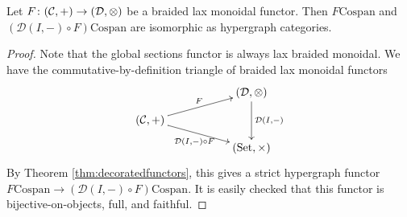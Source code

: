 \begin{proposition} \label{prop.setdecorations}
  Let $F{\colon} (\mathcal C, +) \to (\mathcal D, \otimes)$ be a braided lax
  monoidal functor. Then $F\mathrm{Cospan}$ and $(\mathcal D(I,-)\circ
  F)\mathrm{Cospan}$ are isomorphic as hypergraph categories.
\end{proposition}
\begin{proof}
  Note that the global sections functor is always lax braided monoidal. We have
  the commutative-by-definition triangle of braided lax monoidal functors
  \[
    \xymatrixrowsep{2ex}
    \xymatrix{
      && (\mathcal D,\otimes) \ar[dd]^{\mathcal D(I,-)} \\
      (\mathcal C,+) \ar[urr]^{F} \ar[drr]_{\mathcal D(I,-)\circ F} \\
      && (\Set, \times)
    }
  \]
  By Theorem \ref{thm:decoratedfunctors}, this gives a strict hypergraph functor
  $F\mathrm{Cospan} \to (\mathcal D(I,-)\circ F)\mathrm{Cospan}$. It is easily
  checked that this functor is bijective-on-objects, full, and faithful.
\end{proof}

